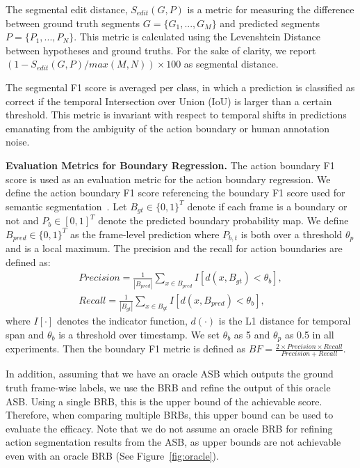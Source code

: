 \documentclass[10pt,twocolumn,letterpaper]{article}
\begin{document}
The segmental edit distance, $S_{edit}(G, P)$ is a metric for measuring the difference between ground truth segments $G = \{G_1, ..., G_M\}$ and predicted segments $P = \{P_1, ..., P_N\}$.
This metric is calculated using the Levenshtein Distance\cite{levenshtein} between hypotheses and ground truths.
For the sake of clarity, we report $(1 - S_{edit}(G, P) / max(M, N)) \times 100$ as segmental distance.

The segmental F1 score is averaged per class, in which a prediction is classified as correct if the temporal Intersection over Union (IoU) is larger than a certain threshold.
This metric is invariant with respect to temporal shifts in predictions emanating from the ambiguity of the action boundary or human annotation noise.


\textbf{Evaluation Metrics for Boundary Regression.}
The action boundary F1 score is used as an evaluation metric for the action boundary regression.
We define the action boundary F1 score referencing the boundary F1 score used for semantic segmentation~\cite{boundaryf1}.
Let $B_{gt} \in \{0, 1\}^T$ denote if each frame is a boundary or not and $P_{b} \in [0, 1]^T$ denote the predicted boundary probability map.
We define $B_{pred} \in \{0, 1\}^T$ as the frame-level prediction where $P_{b, t}$ is both over a threshold $\theta_{p}$ and is a local maximum.
The precision and the recall for action boundaries are defined as:
\begin{eqnarray}
    Precision=\frac{1}{\left|B_{pred}\right|} \sum_{x \in B_{pred}}I\left[d\left(x, B_{gt}\right)<\theta_{b}\right], \\
    Recall=\frac{1}{\left|B_{gt}\right|} \sum_{x \in B_{gt}}I\left[d\left(x, B_{pred}\right)<\theta_{b}\right],
\end{eqnarray}
where $I[\cdot]$ denotes the indicator function, $d(\cdot)$ is the L1 distance for temporal span and $\theta_{b}$ is a threshold over timestamp.
We set $\theta_{b}$ as 5 and $\theta_p$ as 0.5 in all experiments.
Then the boundary F1 metric is defined as $BF=\frac{2 \times Precision \times Recall}{Precision + Recall}$.


In addition, assuming that we have an oracle ASB which outputs the ground truth frame-wise labels,
we use the BRB and refine the output of this oracle ASB.
Using a single BRB, this is the upper bound of the achievable score.
Therefore, when comparing multiple BRBs, this upper bound can be used to evaluate the efficacy. 
Note that we do not assume an oracle BRB for refining action segmentation results from the ASB, as upper bounds are not achievable even with an oracle BRB (See Figure~\ref{fig:oracle}).
\end{document}
